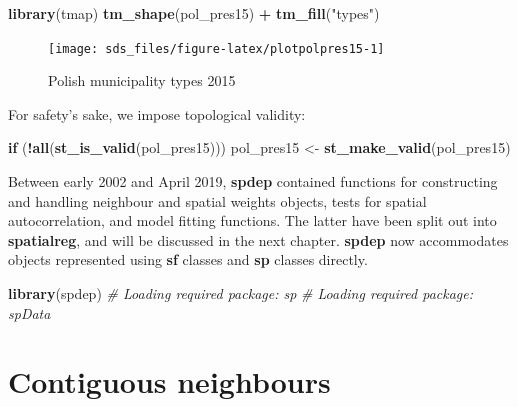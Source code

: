 \documentclass[]{book}
\newenvironment{Shaded}{\begin{snugshade}}{\end{snugshade}}
\newcommand{\CommentTok}[1]{\textcolor[rgb]{0.56,0.35,0.01}{\textit{#1}}}
\newcommand{\ControlFlowTok}[1]{\textcolor[rgb]{0.13,0.29,0.53}{\textbf{#1}}}
\newcommand{\KeywordTok}[1]{\textcolor[rgb]{0.13,0.29,0.53}{\textbf{#1}}}
\newcommand{\NormalTok}[1]{#1}
\newcommand{\OperatorTok}[1]{\textcolor[rgb]{0.81,0.36,0.00}{\textbf{#1}}}
\newcommand{\StringTok}[1]{\textcolor[rgb]{0.31,0.60,0.02}{#1}}
\begin{document}
\begin{Shaded}
\begin{Highlighting}[]
\KeywordTok{library}\NormalTok{(tmap)}
\KeywordTok{tm_shape}\NormalTok{(pol_pres15) }\OperatorTok{+}\StringTok{ }\KeywordTok{tm_fill}\NormalTok{(}\StringTok{"types"}\NormalTok{)}
\end{Highlighting}
\end{Shaded}

\begin{figure}

{\centering \texttt{[image: sds\_files/figure-latex/plotpolpres15-1]} 

}

\caption{Polish municipality types 2015}\label{fig:plotpolpres15}
\end{figure}

For safety's sake, we impose topological validity:

\begin{Shaded}
\begin{Highlighting}[]
\ControlFlowTok{if}\NormalTok{ (}\OperatorTok{!}\KeywordTok{all}\NormalTok{(}\KeywordTok{st_is_valid}\NormalTok{(pol_pres15))) pol_pres15 <-}\StringTok{ }\KeywordTok{st_make_valid}\NormalTok{(pol_pres15)}
\end{Highlighting}
\end{Shaded}

Between early 2002 and April 2019, \textbf{spdep} contained functions for constructing and handling neighbour and spatial weights objects, tests for spatial autocorrelation, and model fitting functions. The latter have been split out into \textbf{spatialreg}, and will be discussed in the next chapter. \textbf{spdep} \citep{R-spdep} now accommodates objects represented using \textbf{sf} classes and \textbf{sp} classes directly.

\begin{Shaded}
\begin{Highlighting}[]
\KeywordTok{library}\NormalTok{(spdep)}
\CommentTok{# Loading required package: sp}
\CommentTok{# Loading required package: spData}
\end{Highlighting}
\end{Shaded}

\hypertarget{contiguous-neighbours}{%
\section{Contiguous neighbours}\label{contiguous-neighbours}}
\end{document}
